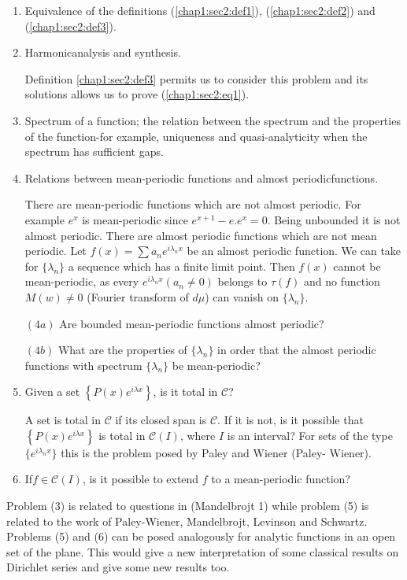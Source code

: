 \begin{enumerate}[(1)]
\item Equivalence of the definitions (\ref{chap1:sec2:def1}),
  (\ref{chap1:sec2:def2}) and (\ref{chap1:sec2:def3}).
\item Harmonic\pageoriginale analysis and synthesis.

 Definition \ref{chap1:sec2:def3} permits us to consider this problem and its solutions
 allows us to prove (\ref{chap1:sec2:eq1}). 
\item Spectrum of a function; the relation between the spectrum and
 the properties of the function-for example, uniqueness and
 quasi-analy\-ticity when the spectrum has sufficient gaps. 
\item Relations between mean-periodic functions and almost
  periodic\break  functions.

 There are mean-periodic functions which are not almost periodic. For
 example $e^x$ is mean-periodic since $e^{x+1} -e. e^x = 0$. Being
 unbounded it is not almost periodic. There are almost periodic
 functions which are not mean periodic. Let $f(x) = \sum a_n e^{i
 \lambda_n x}$ be an almost periodic function. We can take for $\{
 \lambda_n \}$ a sequence which has a finite limit point. Then $f(x)$
 cannot be mean-periodic, as every $e^{i \lambda_n x} (a_n \neq 0)$
 belongs to $\tau (f)$ and no function $M(w) \neq 0$ (Fourier
 transform of $d \mu$) can vanish on $\{ \lambda_n \}$. 

 $(4a)$ Are bounded mean-periodic functions almost periodic?

 $(4b)$ What are the properties of $\{ \lambda_n \} $ in order that
 the almost periodic functions with spectrum $\{ \lambda_n \} $ be
 mean-periodic? 
\item Given a set $\left\{ P(x) e^{i \lambda x } \right\}$, is it
 total in $\mathscr{C}$? 

 A set is total in $\mathscr{C}$ if its closed span is
 $\mathscr{C}$. 
 If it is not, is it possible that $\left\{P (x) e^{i \lambda x }
 \right\}$ is total in $\mathscr{C} (I)$, where $I$ is an interval?
 For sets of the type $\{ e^{i \lambda_n x}\}$ this is the problem
 posed by Paley and Wiener (Paley- Wiener). 
\item If\pageoriginale $f \in \mathscr{C} (I)$, is it possible to extend $f$ to a
 mean-periodic function? 
\end{enumerate}

Problem (3) is related to questions in (Mandelbrojt 1) while
problem (5) is related to the work of Paley-Wiener, Mandelbrojt,
Levinson and Schwartz. Problems (5) and (6) can be posed
analogously for analytic functions in an open set of the plane. This
would give a new interpretation of some classical results on
Dirichlet series and give some new results too. 
